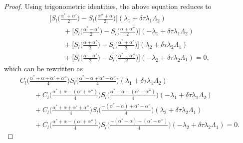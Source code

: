 \documentclass[pdftex]{sigma}
\numberwithin{equation}{section}
\begin{document}
\begin{proof}
Using trigonometric identities,
the above equation reduces to
\begin{gather*}
\biggl[S_l\biggl(\frac{\alpha^*+\alpha'}{2}\biggr) - S_l\biggl(\frac{\alpha''+\alpha}{2}\biggr) \biggr]
(\lambda_1 +\delta\tau\lambda_1\Lambda_2)\\
 \qquad{} +\biggl[S_l\biggl(\frac{\alpha^*-\alpha'}{2}\biggr) - S_l\biggl(\frac{\alpha+\alpha''}{2}\biggr) \biggr]
(-\lambda_1 +\delta\tau\lambda_1\Lambda_2) \\
 \qquad{} +\biggl[S_l\biggl(\frac{\alpha+\alpha'}{2}\biggr) - S_l\biggl(\frac{\alpha^*+\alpha'}{2}\biggr) \biggr]
(\lambda_2 +\delta\tau\lambda_2\Lambda_1)\\
 \qquad{} +\biggl[S_l\biggl(\frac{\alpha-\alpha'}{2}\biggr) - S_l\biggl(\frac{\alpha^*-\alpha''}{2}\biggr) \biggr]
(-\lambda_2 +\delta\tau\lambda_2\Lambda_1)=0,
\end{gather*}
 which can be rewritten as
 \begin{gather*}
 C_l\biggl(\frac{\alpha^*+\alpha+\alpha'+\alpha''}{4}\biggr) S_l\biggl(\frac{\alpha^*-\alpha+\alpha'-\alpha''}{4}\biggr) (\lambda_1 +\delta\tau\lambda_1\Lambda_2)\\
 \qquad{} + C_l\biggl(\frac{\alpha^*+\alpha-(\alpha'+\alpha'')}{4}\biggr) S_l\biggl(\frac{\alpha^*-\alpha-(\alpha'-\alpha'')}{4}\biggr) (-\lambda_1 +\delta\tau\lambda_1\Lambda_2)\\
 \qquad{} + C_l\biggl(\frac{\alpha^*+\alpha+\alpha'+\alpha''}{4}\biggr) S_l\biggl(\frac{-(\alpha^*-\alpha)+\alpha'-\alpha''}{4}\biggr) (\lambda_2 +\delta\tau\lambda_2\Lambda_1)\\
 \qquad{} + C_l\biggl(\frac{\alpha^*+\alpha-(\alpha'+\alpha'')}{4}\biggr) S_l\biggl(\frac{-(\alpha^*-\alpha)-(\alpha'-\alpha'')}{4}\biggr) (-\lambda_2 +\delta\tau\lambda_2\Lambda_1)=0.
 \end{gather*}


\end{proof}
\end{document}

